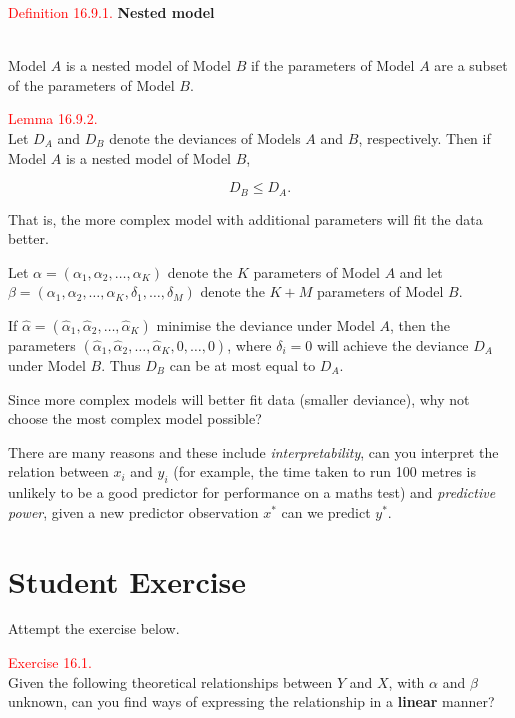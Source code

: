 \documentclass[
]{book}
\begin{document}
\leavevmode{}%
\textcolor{red}{Definition 16.9.1.}
{\textbf{Nested model}}\\
\strut \\
Model \(A\) is a nested model of Model \(B\) if the parameters of Model \(A\) are a subset of the parameters of Model \(B\).

\hypertarget{Sec_LinearI:lem:nested}{}
\textcolor{red}{Lemma 16.9.2.}\\
Let \(D_A\) and \(D_B\) denote the deviances of Models \(A\) and \(B\), respectively. Then if Model \(A\) is a nested model of Model \(B\),

\[ D_B \leq D_A.\]

That is, the more complex model with additional parameters will fit the data better.

Let \(\alpha = (\alpha_1, \alpha_2, \ldots, \alpha_K)\) denote the \(K\) parameters of Model \(A\) and let \(\beta = (\alpha_1, \alpha_2, \ldots, \alpha_K,\delta_1, \ldots, \delta_M)\) denote the \(K+M\) parameters of Model \(B\).

If \(\hat{\alpha} = (\hat{\alpha}_1, \hat{\alpha}_2, \ldots, \hat{\alpha}_K)\) minimise the deviance under Model \(A\), then the parameters \((\hat{\alpha}_1, \hat{\alpha}_2, \ldots, \hat{\alpha}_K,0, \ldots, 0)\), where \(\delta_i =0\) will achieve the deviance \(D_A\) under Model \(B\). Thus \(D_B\) can be at most equal to \(D_A\).

\hfill\break
Since more complex models will better fit data (smaller deviance), why not choose the most complex model possible?

There are many reasons and these include \emph{interpretability}, can you interpret the relation between \(x_i\) and \(y_i\) (for example, the time taken to run 100 metres is unlikely to be a good predictor for performance on a maths test) and \emph{predictive power}, given a new predictor observation \(x^\ast\) can we predict \(y^\ast\).

\hypertarget{Sec_LinearI:exer}{%
\section*{\texorpdfstring{{\textbf{Student Exercise}}}{Student Exercise}}\label{Sec_LinearI:exer}}

Attempt the exercise below.

\leavevmode{}%
\textcolor{red}{Exercise 16.1.}\\
Given the following theoretical relationships between \(Y\) and \(X\), with \(\alpha\) and \(\beta\) unknown, can you find ways of expressing the relationship in a \textbf{linear} manner?
\end{document}
